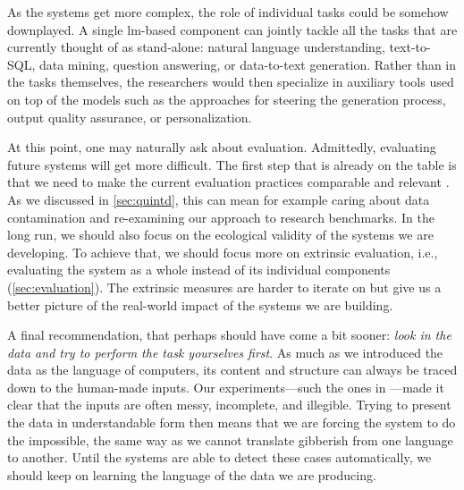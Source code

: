 As the systems get more complex, the role of individual tasks could be somehow downplayed. A single \ac{lm}-based component can jointly tackle all the tasks that are currently thought of as stand-alone: natural language understanding, text-to-SQL, data mining, question answering, or data-to-text generation.  Rather than in the tasks themselves, the researchers would then specialize in auxiliary tools used on top of the models such as the approaches for steering the generation process, output quality assurance, or personalization.


At this point, one may naturally ask about evaluation. Admittedly, evaluating future systems will get more difficult. The first step that is already on the table is that we need to make the current evaluation practices comparable and relevant \cite{gehrmannRepairingCrackedFoundation2022,van_miltenburg_barriers_2023}.  As we discussed in \autoref{sec:quintd}, this can mean for example caring about data contamination and re-examining our approach to research benchmarks. In the long run, we should also focus on the ecological validity of the systems we are developing. To achieve that, we should focus more on extrinsic evaluation, i.e., evaluating the system as a whole instead of its individual components (\autoref{sec:evaluation}). The extrinsic measures are harder to iterate on but give us a better picture of the real-world impact of the systems we are building.

A final recommendation, that perhaps should have come a bit sooner: \emph{look in the data and try to perform the task yourselves first}. As much as we introduced the data as the language of computers, its content and structure can always be traced down to the human-made inputs. Our experiments---such the ones in ---made it clear that the inputs are often messy, incomplete, and illegible. Trying to present the data in understandable form then means that we are forcing the system to do the impossible, the same way as we cannot translate gibberish from one language to another. Until the systems are able to detect these cases automatically, we should keep on learning the language of the data we are producing.